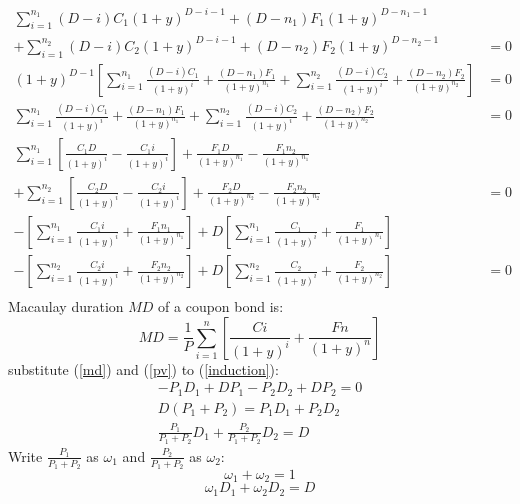 \documentclass{article}
\begin{document}
    \begin{equation}
        \begin{aligned}
            \sum_{i=1}^{n_{1}} (D-i)C_{1}(1+y)^{D-i-1} + (D-n_{1})F_{1}(1+y)^{D-n_{1}-1} \\
            +\sum_{i=1}^{n_{2}} (D-i)C_{2}(1+y)^{D-i-1} + (D-n_{2})F_{2}(1+y)^{D-n_{2}-1} &= 0\\
            (1+y)^{D-1}\left[\sum_{i=1}^{n_{1}}\frac{(D-i)C_{1}}{(1+y)^{i}} + \frac{(D-n_{1})F_{1}}{(1+y)^{n_{1}}} + \sum_{i=1}^{n_{2}}\frac{(D-i)C_{2}}{(1+y)^{i}} + \frac{(D-n_{2})F_{2}}{(1+y)^{n_{2}}}\right] &= 0\\
            \sum_{i=1}^{n_{1}}\frac{(D-i)C_{1}}{(1+y)^{i}} + \frac{(D-n_{1})F_{1}}{(1+y)^{n_{1}}} + \sum_{i=1}^{n_{2}}\frac{(D-i)C_{2}}{(1+y)^{i}} + \frac{(D-n_{2})F_{2}}{(1+y)^{n_{2}}} &= 0\\
            \sum_{i=1}^{n_{1}}\left[\frac{C_{1}D}{(1+y)^i}-\frac{C_{1}i}{(1+y)^{i}}\right]+\frac{F_{1}D}{(1+y)^{n_{1}}}-\frac{F_{1}n_{2}}{(1+y)^{n_{1}}} \\+ \sum_{i=1}^{n_{2}}\left[\frac{C_{2}D}{(1+y)^i}-\frac{C_{2}i}{(1+y)^{i}}\right]+\frac{F_{2}D}{(1+y)^{n_{2}}}-\frac{F_{2}n_{2}}{(1+y)^{n_{2}}} &= 0\\
            -\left[\sum_{i=1}^{n_{1}}\frac{C_{1}i}{(1+y)^{i}}+\frac{F_{1}n_{1}}{(1+y)^{n_{1}}}\right] + D \left[\sum_{i=1}^{n_{1}}\frac{C_{1}}{(1+y)^i}+\frac{F_{1}}{(1+y)^{n_{1}}}\right] \\  -\left[\sum_{i=1}^{n_{2}}\frac{C_{2}i}{(1+y)^{i}}+\frac{F_{2}n_{2}}{(1+y)^{n_{2}}}\right] + D \left[\sum_{i=1}^{n_{2}}\frac{C_{2}}{(1+y)^i}+\frac{F_{2}}{(1+y)^{n_{2}}}\right]&= 0\\\

        \end{aligned}
        \label{induction}
    \end{equation}
    Macaulay duration $MD$ of a coupon bond is:
    \begin{equation}
        \label{md}
        MD = \frac{1}{P}\sum_{i=1}^{n}\left[\frac{Ci}{(1+y)^{i}}+\frac{Fn}{(1+y)^{n}}\right]
    \end{equation}
    substitute (\ref{md}) and (\ref{pv}) to (\ref{induction}):
    \begin{equation*}
        \begin{aligned}
            -P_{1}D_{1} + DP_{1} - P_{2}D_{2} + DP_{2}= 0\\
            D(P_{1}+P_{2})=P_{1}D_{1}+P_{2}D_{2}\\
            \frac{P_1}{P_1+P_2}D_{1}
            + \frac{P_2}{P_1+P_2}D_{2} = D
        \end{aligned}
    \end{equation*}
    Write $\frac{P_1}{P_1+P_2}$ as $\omega_{1}$ and $\frac{P_2}{P_1+P_2}$ as $\omega_{2}$:
    \begin{equation*}
        \omega_{1} + \omega_{2} = 1
    \end{equation*}
    \begin{equation*}
        \omega_{1}D_{1}+\omega_{2}D_{2} = D
    \end{equation*}
\end{document}
